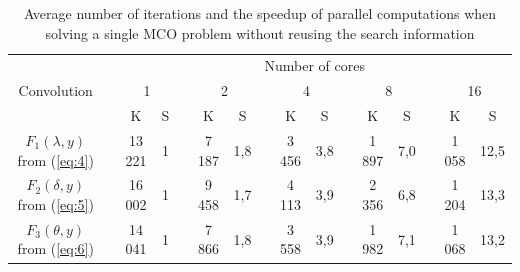 \documentclass[runningheads]{llncs}
\begin{document}
\begin{table}[t]
\caption{Average number of iterations and the speedup of parallel computations when solving a single MCO problem without reusing the search information}\label{tab:1}
\centering
\begin{tabular}{clcclcclcclcclcc}
\hline
           &  & \multicolumn{14}{c}{Number of cores}                                                                                               \\ \cline{3-16}
Convolution&  & \multicolumn{2}{c}{1} &  & \multicolumn{2}{c}{2} &  & \multicolumn{2}{c}{4} &  & \multicolumn{2}{c}{8} &  & \multicolumn{2}{c}{16} \\ \cline{3-4} \cline{6-7} \cline{9-10} \cline{12-13} \cline{15-16} 
           &  & K            & S      &  & K          & S        &  & K          & S        &  & K          & S        &  & K          & S         \\ \cline{1-1} \cline{3-4} \cline{6-7} \cline{9-10} \cline{12-13} \cline{15-16} 
$F_1 (\lambda,y)$ from (\ref{eq:4}) &  & 13 221       & 1      &  & 7 187      & 1,8      &  & 3 456      & 3,8      &  & 1 897      & 7,0      &  & 1 058      & 12,5      \\
$F_2 (\delta,y)$ from (\ref{eq:5})  &  & 16 002       & 1      &  & 9 458      & 1,7      &  & 4 113      & 3,9      &  & 2 356      & 6,8      &  & 1 204      & 13,3      \\
$F_3 (\theta,y)$ from (\ref{eq:6})  &  & 14 041       & 1      &  & 7 866      & 1,8      &  & 3 558      & 3,9      &  & 1 982      & 7,1      &  & 1 068      & 13,2      \\ \hline
\end{tabular}
\end{table}
\end{document}

